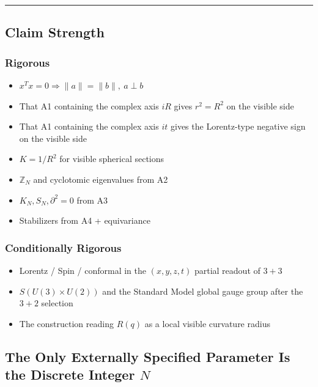 \documentclass[
  a4paper,
]{article}
\providecommand{\tightlist}{%
  \setlength{\itemsep}{0pt}\setlength{\parskip}{0pt}}
\begin{document}
\begin{center}\rule{0.5\linewidth}{0.5pt}\end{center}

\subsection{Claim Strength}\label{claim-strength}

\subsubsection{Rigorous}\label{rigorous}

\begin{itemize}
\tightlist
\item
  \(x^Tx=0\Rightarrow \|a\|=\|b\|,\ a\perp b\)
\item
  That A1 containing the complex axis \(iR\) gives \(r^2=R^2\) on the
  visible side
\item
  That A1 containing the complex axis \(it\) gives the Lorentz-type
  negative sign on the visible side
\item
  \(K=1/R^2\) for visible spherical sections
\item
  \(\mathbb Z_N\) and cyclotomic eigenvalues from A2
\item
  \(K_N,S_N,\partial^2=0\) from A3
\item
  Stabilizers from A4 + equivariance
\end{itemize}

\subsubsection{Conditionally Rigorous}\label{conditionally-rigorous}

\begin{itemize}
\tightlist
\item
  Lorentz / Spin / conformal in the \((x,y,z,t)\) partial readout of
  \(3+3\)
\item
  \(S(U(3)\times U(2))\) and the Standard Model global gauge group after
  the \(3+2\) selection
\item
  The construction reading \(R(q)\) as a local visible curvature radius
\end{itemize}

\subsection{\texorpdfstring{The Only Externally Specified Parameter Is
the Discrete Integer
\(N\)}{The Only Externally Specified Parameter Is the Discrete Integer N}}\label{the-only-externally-specified-parameter-is-the-discrete-integer-n}
\end{document}
